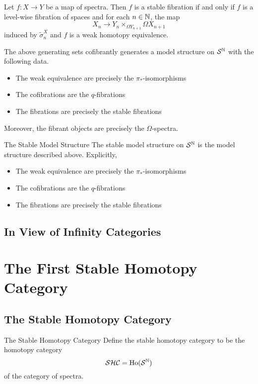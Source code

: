 \documentclass[a4paper]{article}
\begin{document}
\begin{prp}{}{} Let $f:X\to Y$ be a map of spectra. Then $f$ is a stable fibration if and only if $f$ is a level-wise fibration of spaces and for each $n\in\mathbb{N}$, the map $$X_n\to Y_n\times_{\Omega Y_{n+1}}\Omega X_{n+1}$$ induced by $\widetilde{\sigma}_n^X$ and $f$ is a weak homotopy equivalence. 
\end{prp}

\begin{thm}{}{} The above generating sets cofibrantly generates a model structure on $\mathcal{S}^{\mathbb{N}}$ with the following data. 
\begin{itemize}
\item The weak equivalence are precisely the $\pi_\ast$-isomorphisms
\item The cofibrations are the $q$-fibrations
\item The fibrations are precisely the stable fibrations
\end{itemize}
Moreover, the fibrant objects are precisely the $\Omega$-spectra. 
\end{thm}

\begin{defn}{The Stable Model Structure}{} The stable model structure on $\mathcal{S}^{\mathbb{N}}$ is the model structure described above. Explicitly, 
\begin{itemize}
\item The weak equivalence are precisely the $\pi_\ast$-isomorphisms
\item The cofibrations are the $q$-fibrations
\item The fibrations are precisely the stable fibrations
\end{itemize}
\end{defn}

\subsection{In View of Infinity Categories}

\pagebreak
\section{The First Stable Homotopy Category}
\subsection{The Stable Homotopy Category}
\begin{defn}{The Stable Homotopy Category}{} Define the stable homotopy category to be the homotopy category $$\mathcal{S}\mathcal{H}\mathcal{C}=\text{Ho}(\mathcal{S}^{\mathbb{N}})$$ of the category of spectra. 
\end{defn}
\end{document}

